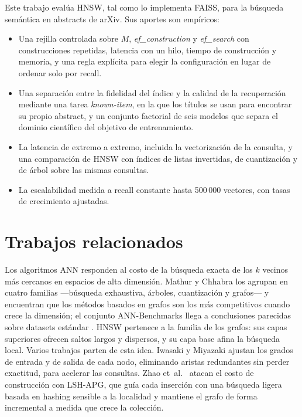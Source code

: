 \documentclass[runningheads]{llncs}
\newcommand{\efc}{\textit{ef\_construction}}
\newcommand{\efs}{\textit{ef\_search}}
\begin{document}
Este trabajo evalúa HNSW, tal como lo implementa FAISS, para la búsqueda semántica en
abstracts de arXiv. Sus aportes son empíricos:
\begin{itemize}
\item Una rejilla controlada sobre $M$, \efc{} y \efs{} con construcciones repetidas,
latencia con un hilo, tiempo de construcción y memoria, y una regla explícita para elegir la
configuración en lugar de ordenar solo por recall.
\item Una separación entre la fidelidad del índice y la calidad de la recuperación mediante
una tarea \textit{known-item}, en la que los títulos se usan para encontrar su propio
abstract, y un conjunto factorial de seis modelos que separa el dominio científico del
objetivo de entrenamiento.
\item La latencia de extremo a extremo, incluida la vectorización de la consulta, y una
comparación de HNSW con índices de listas invertidas, de cuantización y de árbol sobre las
mismas consultas.
\item La escalabilidad medida a recall constante hasta 500\,000 vectores, con tasas de
crecimiento ajustadas.
\end{itemize}

\section{Trabajos relacionados}

Los algoritmos ANN responden al costo de la búsqueda exacta de los $k$ vecinos más cercanos
en espacios de alta dimensión. Mathur y Chhabra \cite{ref4} los agrupan en cuatro familias
---búsqueda exhaustiva, árboles, cuantización y grafos--- y encuentran que los métodos basados
en grafos son los más competitivos cuando crece la dimensión; el conjunto ANN-Benchmarks
llega a conclusiones parecidas sobre datasets estándar \cite{aumuller2020}. HNSW \cite{ref5}
pertenece a la familia de los grafos: sus capas superiores ofrecen saltos largos y dispersos,
y su capa base afina la búsqueda local. Varios trabajos parten de esta idea. Iwasaki y
Miyazaki \cite{ref13} ajustan los grados de entrada y de salida de cada nodo, eliminando
aristas redundantes sin perder exactitud, para acelerar las consultas. Zhao
et~al.~\cite{ref14} atacan el costo de construcción con LSH-APG, que guía cada inserción con
una búsqueda ligera basada en hashing sensible a la localidad y mantiene el grafo de forma
incremental a medida que crece la colección.
\end{document}
